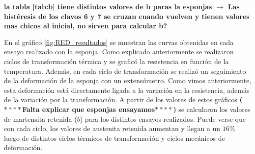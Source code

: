 \documentclass[a4paper,12pt,fleqn,twoside,openany]{book}
\begin{document}
% 
% 
% 
% 

\textbf{la tabla \ref{tab:b} tiene distintos valores de b paras la esponjas $\rightarrow$ Las histéresis de los clavos 6 y 7 se cruzan cuando vuelven y tienen valores mas chicos al inicial, no sirven para calcular b?}

En el gráfico \ref{fig:RED_resultados} se muestran las curvas obtenidas en cada ensayo realizado con la esponja. Como explicado anteriormente se realizaron ciclos de transformación térmica y se graficó la resistencia en función de la temperatura. Además, en cada ciclo de transformación se realizó un seguimiento de la deformación de la esponja con un extensómetro. Como vimos anteriormente, esta deformación está directamente ligada a la variación en la resistencia, además de la variación por la transformación. A partir de los valores de estos gráficos  
\textbf{($****$Falta explicar que esponjas ensayamos$****$)} 
se calcularon los valores de martensita retenida ($b$) para los distintos ensayos realizados. Puede verse que con cada ciclo, los valores de austenita retenida aumentan y llegan a un $16\%$ luego de distintos ciclos térmicos de transformación y ciclos mecánicos de deformación.
\end{document}
